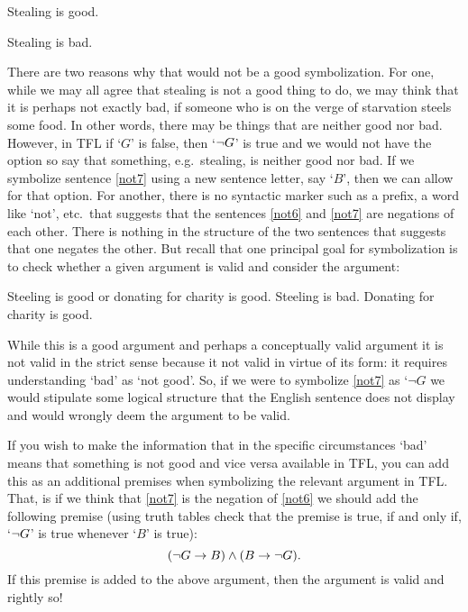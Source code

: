 \begin{earg}
		\item[\ex{not6}] Stealing is good.
		\item[\ex{not7}] Stealing is bad.
		\end{earg}

There are two reasons why that would not be a good symbolization. For one, while we may all agree that stealing is not a good thing to do, we may think that it is perhaps not exactly bad, if someone who is on the verge of starvation steels some food. In other words, there may be things that are neither good nor bad. However,  in TFL if `$G$' is false, then `$\neg G$' is true and we would not have the option so say that something, e.g.~stealing, is neither good nor bad. If we symbolize sentence \ref{not7} using a new sentence letter, say `$B$', then we can allow for that option. For another, there is no syntactic marker such as a prefix, a word like `not', etc.~that suggests that the sentences \ref{not6} and \ref{not7} are negations of each other. There is nothing in the structure of the two sentences that suggests that one negates the other.  But recall that one principal goal for symbolization is to check whether a given argument is valid and consider the argument:
\begin{earg}
\prem Steeling is good or donating for charity is good.
\prem Steeling is bad.
\conc Donating for charity is good.
\end{earg}
While this is a good argument and perhaps a conceptually valid argument it is not valid in the strict sense because it not valid in virtue of its form: it requires understanding `bad' as `not good'. So, if we were to symbolize \ref{not7} as `$\neg G$ we would stipulate some logical structure that the English sentence does not display and would wrongly deem the argument to be valid.


If you wish to make the information that in the specific circumstances `bad' means that something is not good and vice versa available in TFL, you can add this as an additional premises when symbolizing the relevant argument in TFL. That, is if we think that \ref{not7} is the negation of \ref{not6} we should add the following premise (using truth tables check that the premise is true, if and only if, `$\neg G$' is true whenever `$B$' is true): $$(\neg G\rightarrow B)\mathbin{\wedge} (B\rightarrow \neg G).$$ If this premise is added to the above argument, then the argument is valid and rightly so!

